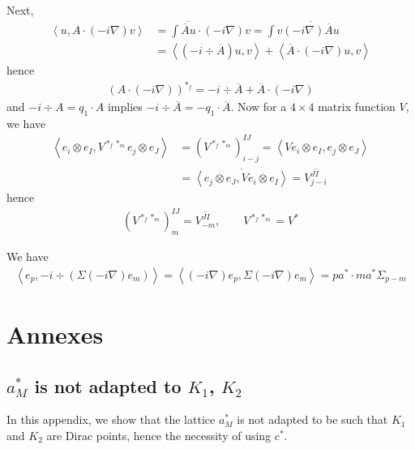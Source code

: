 \documentclass[11pt,a4paper,reqno,french,tikz]{amsart}
\newcommand{\pa}[1]{\left( #1 \right)} %
\newcommand{\ps}[1]{\left< #1 \right>} %
\newcommand{\na}{\nabla} %
\begin{document}
Next, 
\begin{align*}
	\ps{u, A\cdot (-i\na) v} &= \int \overline{\overline{A}u} \cdot (-i\na)v = \int v \overline{(-i\na) \overline{A} u} \\
&= \ps{\pa{-i \div \overline{A}} u,v} + \ps{\overline{A}\cdot (-i\na) u,v}
\end{align*}
hence
\begin{align*}
\pa{A\cdot (-i\na)}^{*_f} = -i \div \overline{A} + \overline{A} \cdot(-i\na)
\end{align*}
and $-i \div A = q_1 \cdot A$ implies $-i\div \overline{A} = -q_1 \cdot \overline{A}$.
Now for a $4 \times 4$ matrix function $V$, we have
\begin{align*}
	\ps{e_i \otimes e_I, V^{*_f *_m} e_j \otimes e_J} &= \pa{V^{*_f *_m}}^{IJ}_{i-j} = \ps{V e_i \otimes e_I, e_j \otimes e_J} \\
&= \overline{\ps{e_j \otimes e_J, V e_i \otimes e_I}} = \overline{V^{JI}_{j-i}}
\end{align*}
hence
\begin{align*}
\pa{V^{*_f *_m}}^{IJ}_{m} = \overline{V^{JI}_{-m}}, \qquad V^{*_f *_m} = V^*
\end{align*}

We have
\begin{align*}
\ps{e_p, -i\div \pa{\Sigma \pa{-i\na} e_m}} = \ps{\pa{-i\na} e_p,\Sigma \pa{-i\na} e_m} = pa^* \cdot ma^* \Sigma_{p-m}
\end{align*}



\section{Annexes}%
\label{sec:annexes}

\subsection{$a_M^*$ is not adapted to $K_1$, $K_2$}%
\label{sub:_a_m_is_not_adapted_to_k_1_k_2_}

In this appendix, we show that the lattice $a_M^*$ is not adapted to be such that $K_1$ and $K_2$ are Dirac points, hence the necessity of using $c^*$.
\end{document}
